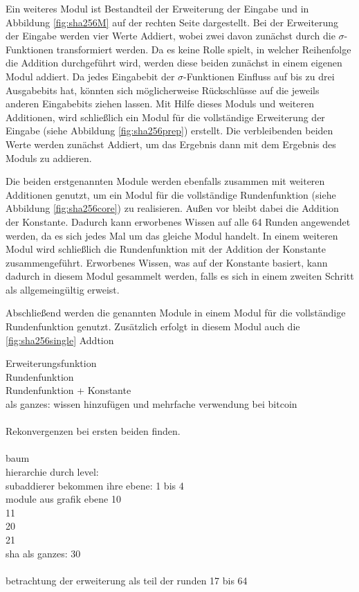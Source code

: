 Ein weiteres Modul ist Bestandteil der Erweiterung der Eingabe und in Abbildung \ref{fig:sha256M} auf der rechten Seite
dargestellt. Bei der Erweiterung der Eingabe werden vier Werte Addiert, wobei zwei davon zunächst durch die $ \sigma $-Funktionen
transformiert werden. Da es keine Rolle spielt, in welcher Reihenfolge die Addition durchgeführt wird, werden diese
beiden zunächst in einem eigenen Modul addiert. Da jedes Eingabebit der $ \sigma $-Funktionen Einfluss auf bis zu
drei Ausgabebits hat, könnten sich möglicherweise Rückschlüsse auf die jeweils anderen Eingabebits ziehen lassen.
Mit Hilfe dieses Moduls und weiteren Additionen, wird schließlich ein Modul für die vollständige Erweiterung der Eingabe
(siehe Abbildung \ref{fig:sha256prep}) erstellt. Die verbleibenden beiden Werte werden zunächst Addiert, um das Ergebnis
dann mit dem Ergebnis des Moduls zu addieren.

Die beiden erstgenannten Module werden ebenfalls zusammen mit weiteren Additionen genutzt, um ein Modul für die vollständige
Rundenfunktion (siehe Abbildung \ref{fig:sha256core}) zu realisieren. Außen vor bleibt dabei die Addition der Konstante.
Dadurch kann erworbenes Wissen auf alle 64 Runden angewendet werden, da es sich jedes Mal um das gleiche Modul handelt.
In einem weiteren Modul wird schließlich die Rundenfunktion mit der Addition der Konstante zusammengeführt.
Erworbenes Wissen, was auf der Konstante basiert, kann dadurch in diesem Modul gesammelt werden, falls es sich in einem
zweiten Schritt als allgemeingültig erweist.

Abschließend werden die genannten Module in einem Modul für die vollständige Rundenfunktion genutzt. Zusätzlich erfolgt in
diesem Modul auch die \ref{fig:sha256single} Addtion 

Erweiterungsfunktion\\
Rundenfunktion\\
Rundenfunktion + Konstante\\
 als ganzes: wissen hinzufügen und mehrfache verwendung bei bitcoin\\
~\\
Rekonvergenzen bei ersten beiden finden.\\
~\\
baum\\
hierarchie durch level:\\
subaddierer bekommen ihre ebene: 1 bis 4\\
module aus grafik ebene 10\\
11\\
20\\
21\\
sha als ganzes: 30\\
~\\
betrachtung der erweiterung als teil der runden 17 bis 64